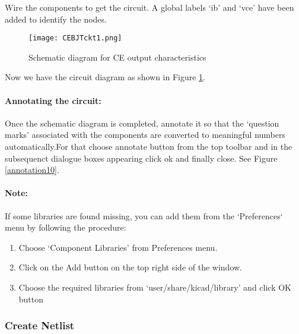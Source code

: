 Wire the components to get the circuit. A global labels `ib' and `vce' have been added to identify the nodes. 
\begin{figure}[h]
\centering
\texttt{[image: CEBJTckt1.png]}
\caption{Schematic diagram for CE output characteristics}
\label{CEBJTckt1}
\end{figure}

Now we have the circuit diagram as shown in Figure \ref{CEBJTckt1}.


\paragraph{Annotating the circuit:} Once the schematic diagram is completed, annotate it so that the `question marks' associated with the components are converted to meaningful numbers automatically.For that choose annotate button from the top toolbar%
and in the subsequenct dialogue boxes appearing click ok and finally close. See Figure \ref{annotation10}.




\paragraph{Note:} If some libraries are found missing, you can add them from the `Preferences` menu by following the procedure: 

\begin{enumerate}
\item
Choose `Component Libraries' from Preferences menu.

\item
Click on the Add button on the top right side of the window.

\item
Choose the required libraries from `user/share/kicad/library' and click OK button

\end{enumerate}

\subsubsection{Create Netlist}

